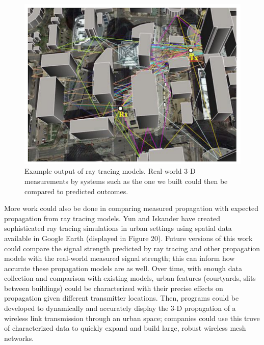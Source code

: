 \documentclass[pageno]{jpaper}
\begin{document}
\begin{figure}[]
\caption[Future work includes comparison with ray tracing models]{Example output of ray tracing models\cite{raytrace}. Real-world 3-D measurements by systems such as the one we built could then be compared to predicted outcomes.}
\centerline{\includegraphics{ray_tracing}}
\end{figure}

More work could also be done in comparing measured propagation with expected propagation from ray tracing models. Yun and Iskander have created sophisticated ray tracing\cite{raytrace} simulations in urban settings using spatial data available in Google Earth (displayed in Figure 20). Future versions of this work could compare the signal strength predicted by ray tracing and other propagation models with the real-world measured signal strength; this can inform how accurate these propagation models are as well. Over time, with enough data collection and comparison with existing models, urban features (courtyards, slits between buildings) could be characterized with their precise effects on propagation given different transmitter locations. Then, programs could be developed to dynamically and accurately display the 3-D propagation of a wireless link transmission through an urban space; companies could use this trove of characterized data to quickly expand and build large, robust wireless mesh networks.



\end{document}

